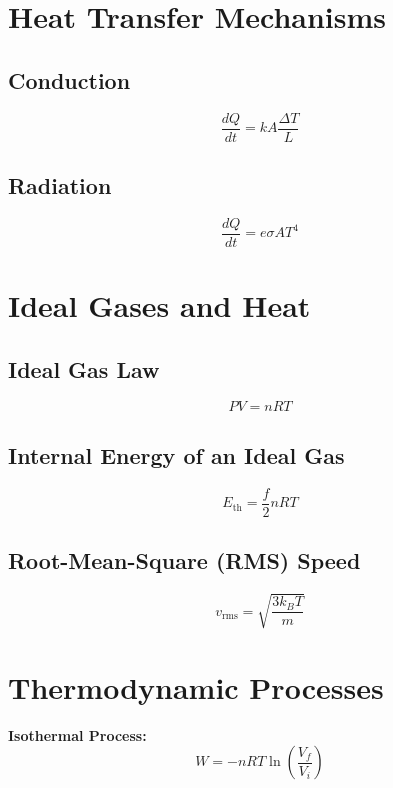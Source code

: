 \documentclass{article}
\begin{document}
\section{Heat Transfer Mechanisms}
\subsection{Conduction}
\begin{equation}
\frac{dQ}{dt} = k A \frac{\Delta T}{L}
\end{equation}

\subsection{Radiation}
\begin{equation}
\frac{dQ}{dt} = e \sigma A T^4
\end{equation}

\section{Ideal Gases and Heat}
\subsection{Ideal Gas Law}
\begin{equation}
PV = nRT
\end{equation}

\subsection{Internal Energy of an Ideal Gas}
\begin{equation}
E_{\text{th}} = \frac{f}{2} nRT
\end{equation}

\subsection{Root-Mean-Square (RMS) Speed}
\begin{equation}
v_{\text{rms}} = \sqrt{\frac{3 k_B T}{m}}
\end{equation}

\section{Thermodynamic Processes}
\textbf{Isothermal Process:}
\begin{equation}
W = - n R T \ln \left( \frac{V_f}{V_i} \right)
\end{equation}
\end{document}

